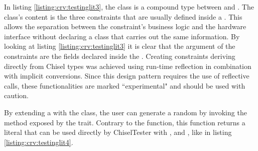 
In listing \ref{listing:crv:testinglit3}, the class 
is a compound type between  and . The class's
content is the three constraints that are usually defined inside a
. This allows the separation between the constraint's business
logic and the hardware interface without declaring a  class that
carries out the same information. By looking at listing
\ref{listing:crv:testinglit3} it is clear that the argument of the constraints
are the fields declared inside the  . Creating
constraints deriving directly from Chisel types was achieved using run-time
reflection in combination with implicit conversions. Since this design pattern
requires the use of reflective calls, these functionalities are marked
``experimental" and should be used with caution.

\par By extending a  with the  class, the user
can generate a random  by invoking the method 
exposed by the  trait. Contrary to the 
function, this function returns a literal  that can be used
directly by ChiselTester with ,  and ,
like in listing \ref{listing:crv:testinglit4}.


